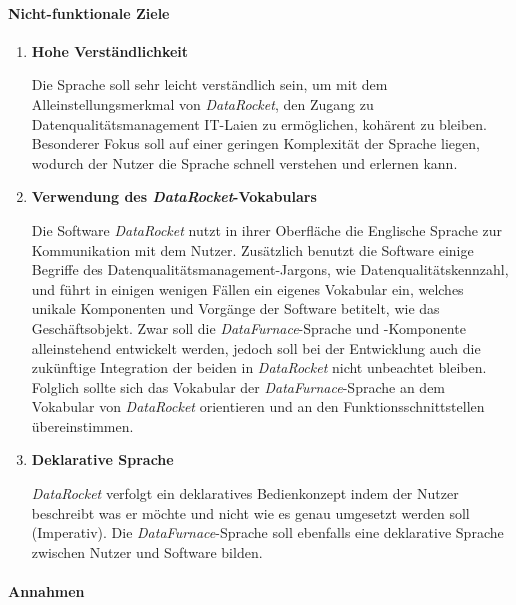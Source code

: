 \documentclass[
  language=german, %
  type=bachelor,%
  ngerman
]{isthesis}
\begin{document}
\begin{content}
  \paragraph{Nicht-funktionale Ziele}
    \begin{enumerate}
      \item \textbf{Hohe Verständlichkeit}\label{item:hohe-verstaendlichkeit}

				Die Sprache soll sehr leicht verständlich sein, um mit dem
				Alleinstellungsmerkmal von \textit{DataRocket}, den Zugang zu
				Datenqualitätsmanagement IT-Laien zu ermöglichen, kohärent zu bleiben.
				Besonderer Fokus soll auf einer geringen Komplexität der Sprache
				liegen, wodurch der Nutzer die Sprache schnell verstehen und erlernen
				kann.

      \item \textbf{Verwendung des \textit{DataRocket}-Vokabulars}

				Die Software \textit{DataRocket} nutzt in ihrer Oberfläche die
				Englische Sprache zur Kommunikation mit dem Nutzer. Zusätzlich benutzt
				die Software einige Begriffe des Datenqualitätsmanagement-Jargons, wie
				\zB{} Datenqualitätskennzahl, und führt in einigen wenigen Fällen ein
				eigenes Vokabular ein, welches unikale Komponenten und Vorgänge der
				Software betitelt, wie \zB{} das Geschäftsobjekt. Zwar soll die
				\textit{DataFurnace}-Sprache und -Komponente alleinstehend entwickelt
				werden, jedoch soll bei der Entwicklung auch die zukünftige Integration
				der beiden in \textit{DataRocket} nicht unbeachtet bleiben. Folglich
				sollte sich das Vokabular der \textit{DataFurnace}-Sprache an dem
				Vokabular von \textit{DataRocket} orientieren und an den
				Funktionsschnittstellen übereinstimmen.

			\item \textbf{Deklarative Sprache}
				
				\textit{DataRocket} verfolgt ein deklaratives Bedienkonzept indem der
				Nutzer beschreibt was er möchte und nicht wie es genau umgesetzt werden
				soll (Imperativ). Die \textit{DataFurnace}-Sprache soll ebenfalls eine
				deklarative Sprache zwischen Nutzer und Software bilden.

    \end{enumerate}

	\paragraph{Annahmen} 


\end{content}
\end{document}
